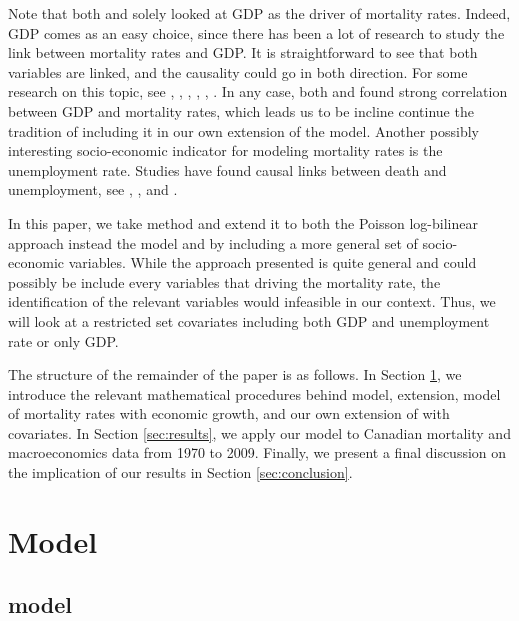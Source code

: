 \documentclass[AER, draftmode]{AEA}
\begin{document}
Note that both \cite{Hanewald2009} and \cite{Niu2014} solely looked at GDP as the driver of mortality rates. Indeed, GDP comes as an easy choice, since there has been a lot of research to study the link between mortality rates and GDP. It is straightforward to see that both variables are linked, and the causality could go in both direction. For some research on this topic, see \cite{Pritchett1996}, \cite{Ettner1996}, \cite{Brenner2005}, \cite{Birchenall2007}, \cite{Swift2011}, \cite{Nandi2012}. In any case, both \cite{Hanewald2009} and \cite{Niu2014} found strong correlation between GDP and mortality rates, which leads us to be incline continue the tradition of including it in our own extension of the \cite{Lee1992} model. Another possibly interesting socio-economic indicator for modeling mortality rates is the unemployment rate. Studies have found causal links between death and unemployment, see \cite{Lundin2010}, \cite{Costa1987}, and \cite{Nylen2001}. 

In this paper, we take \cite{Niu2014} method and extend it to both the \citet{Brouhns2002} Poisson log-bilinear approach instead the \cite{Lee1992} model and by including a more general set of socio-economic variables. While the approach presented is quite general and could possibly be include every variables that driving the mortality rate, the identification of the relevant variables would infeasible in our context. Thus, we will look at a restricted set covariates including both GDP and unemployment rate or only GDP. 

The structure of the remainder of the paper is as follows. In Section \ref{sec:model}, we introduce the relevant mathematical procedures behind \cite{Lee1992} model, \citet{Brouhns2002} extension, \cite{Niu2014} model of mortality rates with economic growth, and our own extension of \citet{Brouhns2002} with covariates. In Section \ref{sec:results}, we apply our model to Canadian mortality and macroeconomics data from 1970 to 2009. Finally, we present a final discussion on the implication of our results in Section \ref{sec:conclusion}.


\section{Model}\label{sec:model}

\subsection{\cite{Lee1992} model} \label{lee}
\end{document}
